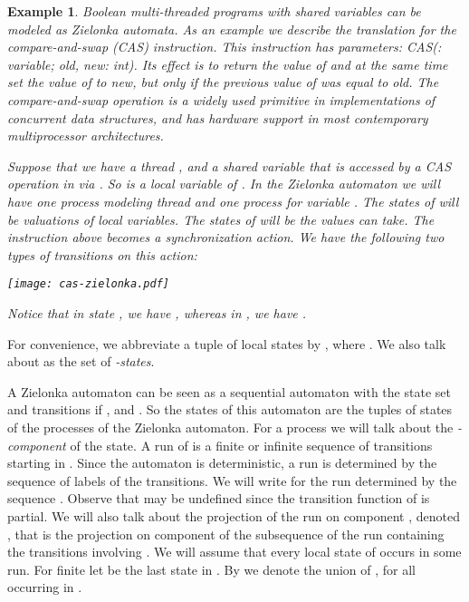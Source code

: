 \documentclass[10pt,a4paper]{article}
\newtheorem{example}[theorem]{Example}
\begin{document}
\begin{example}\label{ex:cas}
  Boolean multi-threaded programs with shared
  variables can be modeled as Zielonka automata. As an example we
  describe the translation for the \emph{compare-and-swap} (CAS)
  instruction. This instruction has  parameters: \textsf{CAS}(:
  variable; \emph{old}, \emph{new}: int). Its effect is to return the
  value of  and at the same time set the value of  to
  \emph{new}, but only if the previous value of  was equal to
  \emph{old}. The compare-and-swap operation is a  widely used primitive
  in implementations of concurrent data structures, and has
  hardware support in most contemporary multiprocessor
  architectures.

  Suppose that we have a thread , and a shared variable  that is
  accessed by a CAS operation in  via . So  is a
  local variable of . In the Zielonka automaton we will have one
  process modeling thread  and one process for variable . The
  states of  will be valuations of local variables. The states of
   will be the values  can take. The  instruction above
  becomes a synchronization action. We have the following two types of
  transitions on this action:
  \begin{center}
    \texttt{[image: cas-zielonka.pdf]}
  \end{center}
Notice that in state , we have , whereas in , we have .
\end{example}


For convenience, we abbreviate a tuple  of local
states by  ,  where . We also talk about 
as the set of \emph{-states}.

A Zielonka automaton can be seen as a sequential automaton with the
state set  and transitions  if
, and . So the states of this automaton
are the tuples of states of the processes of the Zielonka
automaton. For a process  we will talk about the
\emph{-component} of the state.  A run of  is a finite or
infinite sequence of transitions starting in . Since the
automaton is deterministic, a run is determined by the sequence of
labels of the transitions. We will write  for the run
determined by the sequence . Observe that 
may be undefined since the transition function of  is partial. We
will also talk about the projection of the run on component ,
denoted , that is the projection on component  of the
subsequence of the run containing the transitions involving . We
will assume that every local state of  occurs in some run. For
finite  let  be the last state in . By
 we denote the union of , for all 
occurring in .
\end{document}
